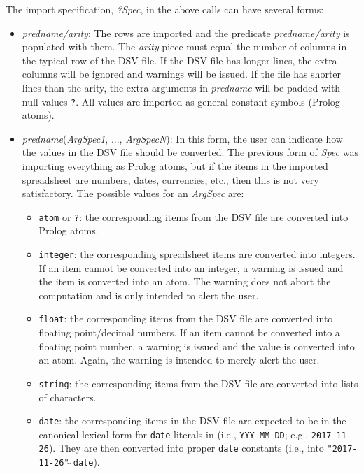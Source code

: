   The import specification, \emph{?Spec}, in the above calls can have
  several forms:
\begin{itemize}
\item  \emph{predname/arity}: The rows are imported and the predicate
  \emph{predname/arity} is populated with them. The \emph{arity} piece must
  equal the number of columns in the typical row of the DSV file.
  If the DSV file has longer lines, the extra columns will be ignored and
  warnings will be issued.
  If the file has shorter lines than the arity, 
  the extra arguments in \emph{predname} will be padded with
  null values \texttt{\bs@?}.
  All values are imported as general \ERGO constant symbols (Prolog atoms).
\item  \emph{predname}(\emph{ArgSpec1}, ..., \emph{ArgSpecN}):   
  In this form, the user can indicate how the values in the DSV file should
  be converted. The previous form of \emph{Spec} was importing everything
  as Prolog atoms, but if the items in the imported spreadsheet
  are numbers, dates, currencies, etc., then this is not very
  satisfactory. The possible values for an \emph{ArgSpec} are:
  \begin{itemize}
  \item    \texttt{atom} or \texttt{?}: the corresponding items from the
    DSV file are converted into Prolog atoms.
  \item   \texttt{integer}: the corresponding spreadsheet items are
    converted into integers. If an
    item cannot be converted into an integer, a warning is issued
    and the item is converted into an atom.
    The warning does not abort the computation and is only intended to alert the
    user.
  \item \texttt{float}: the corresponding items from the
    DSV file are converted into floating
    point/decimal numbers. If an item
    cannot be converted into a floating point number, a warning
    is issued and the value is converted into an atom.
    Again, the warning is intended to merely alert the user.
  \item \texttt{string}: the corresponding items from the
    DSV file are converted into lists of characters.
  \item \texttt{date}: the corresponding items in the DSV file
    are expected to be in the canonical lexical form for
    \texttt{\bs{}date} literals in \FLSYSTEM (i.e., \texttt{YYY-MM-DD};
    e.g., \texttt{2017-11-26}). They are then
    converted into proper \texttt{\bs{}date} constants (i.e., into
    \texttt{"2017-11-26"$\hat{~}\hat{~}$\bs{}date}).

\end{itemize}
\end{itemize}
